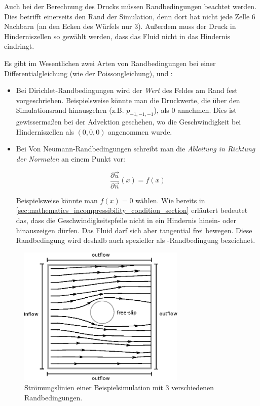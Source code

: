 Auch bei der Berechnung des Drucks müssen Randbedingungen beachtet werden. Dies
betrifft einerseits den Rand der Simulation, denn dort hat nicht jede Zelle 6
Nachbarn (an den Ecken des Würfels nur 3). Außerdem muss der Druck in
Hinderniszellen so gewählt werden, dass das Fluid nicht in das Hindernis
eindringt.

Es gibt im Wesentlichen zwei Arten von Randbedingungen bei einer
Differentialgleichung (wie der Poissongleichung),
 und
:

\begin{itemize}
\item
	Bei Dirichlet-Randbedingungen wird der \emph{Wert} des Feldes am Rand
	fest vorgeschrieben. Beispielsweise könnte man die Druckwerte, die über
	den Simulationsrand hinausgehen (z.B. $p_{-1,-1,-1}$), als $0$ annehmen.
	Dies ist gewissermaßen bei der Advektion geschehen, wo die
	Geschwindigkeit bei Hinderniszellen als $(0,0,0)$ angenommen wurde.
\item
	Bei Von Neumann-Randbedingungen schreibt man die \emph{Ableitung in
	Richtung der Normalen} an einem Punkt vor:

	\begin{equation}
	\frac{
		\partial \vec{u}
	}
	{
		\partial \vec{n}
	}(x)
	=
	f(x)
	\end{equation}

	Beispielsweise könnte man $f(x)=0$ wählen. Wie bereits in
	\autoref{sec:mathematics_incompressibility_condition_section} erläutert
	bedeutet das, dass die Geschwindigkeitspfeile nicht in ein Hindernis
	hinein- oder hinauszeigen dürfen. Das Fluid darf sich aber tangential
	frei bewegen. Diese Randbedingung wird deshalb auch spezieller als
	-Randbedingung bezeichnet.
\end{itemize}

\begin{figure}[ht]
\centering
\includegraphics[width=8cm]{images/boundary_types}
\caption{Strömungslinien einer Beispielsimulation mit 3 verschiedenen Randbedingungen.}
\label{fig:stam_boundary_types}
\end{figure}

